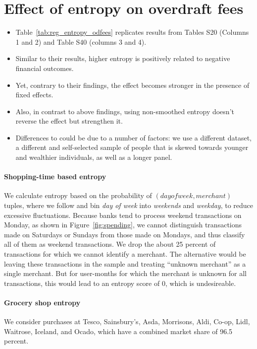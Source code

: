 
\section{Effect of entropy on overdraft fees}%
\label{sub:effect_of_entropy_on_overdraft_fees}

\begin{itemize}

    \item Table~\ref{tab:reg_entropy_odfees} replicates results from
        \citet{muggleton2020evidence} Tables S20 (Columns 1 and 2) and Table
        S40 (columns 3 and 4).

    \item Similar to their results, higher entropy is positively related to
        negative financial outcomes.

    \item Yet, contrary to their findings, the effect becomes stronger in the
        presence of fixed effects.

    \item Also, in contrast to above findings, using non-smoothed entropy
        doesn't reverse the effect but strengthen it.

    \item Differences to \citet{muggleton2020evidence} could be due to a number
        of factors: we use a different dataset, a different and self-selected sample of people
        that is skewed towards younger and wealthier individuals, as well as a
        longer panel.

\end{itemize}




\paragraph{Shopping-time based entropy}
\label{par:shopping_time_based_entropy}

We calculate entropy based on the probability of $(day of week, merchant)$
tuples, where we follow \citet{guidotti2015behavioral} and bin \textit{day of
week} into \textit{weekends} and \textit{weekday}, to reduce excessive
fluctuations. Because banks tend to process weekend transactions on Monday, as
shown in Figure~\ref{fig:spending}, we cannot distinguish transactions made on
Saturdays or Sundays from those made on Mondays, and thus classify all of them
as weekend transactions. We drop the about 25 percent of transactions for which
we cannot identify a merchant. The alternative would be leaving these
transactions in the sample and treating ``unknown merchant'' as a single
merchant. But for user-months for which the merchant is unknown for all
transactions, this would lead to an entropy score of 0, which is undesireable.

\paragraph{Grocery shop entropy}%
\label{par:grocery_shop_entropy}

We consider purchases at Tesco, Sainsbury's, Asda, Morrisons, Aldi, Co-op,
Lidl, Waitrose, Iceland, and Ocado, which have a combined market share of 96.5
percent.

